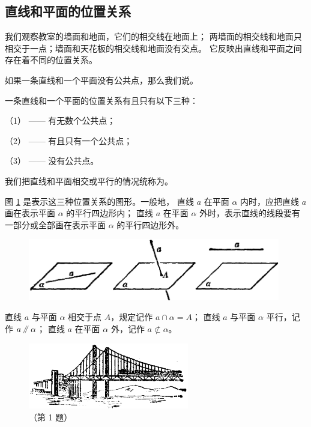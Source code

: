 \subsection{直线和平面的位置关系}\label{subsec:1-7}

我们观察教室的墙面和地面，它们的相交线在地面上；
两墙面的相交线和地面只相交于一点；墙面和天花板的相交线和地面没有交点。
它反映出直线和平面之间存在着不同的位置关系。

如果一条直线和一个平面没有公共点，那么我们说。

一条直线和一个平面的位置关系有且只有以下三种：

（1） —— 有无数个公共点；

（2） —— 有且只有一个公共点；

（3） —— 没有公共点。

我们把直线和平面相交或平行的情况统称为。

图 \ref{fig:ltjh-1-19} 是表示这三种位置关系的图形。一般地，
直线 $a$ 在平面 $\alpha$ 内时，应把直线 $a$ 画在表示平面 $\alpha$ 的平行四边形内；
直线 $a$ 在平面 $\alpha$ 外时，表示直线的线段要有一部分或全部画在表示平面 $\alpha$ 的平行四边形外。

\begin{figure}[htbp]
    \centering
    \includegraphics[width=11cm]{../pic/ltjh-ch1-19.png}
    \caption{}\label{fig:ltjh-1-19}
\end{figure}

直线 $a$ 与平面 $\alpha$ 相交于点 $A$，规定记作 $a \cap \alpha = A$；
直线 $a$ 与平面 $\alpha$ 平行，记作 $a \pingxing \alpha$；
直线 $a$ 在平面 $\alpha$ 外，记作 $a \not \subset \alpha$。


\begin{lianxi}


\begin{figure}[htbp]
    \centering
    \includegraphics[width=7cm]{../pic/ltjh-ch1-subsec7-lx-01.png}
    \caption*{（第 1 题）}
\end{figure}



\end{lianxi}

